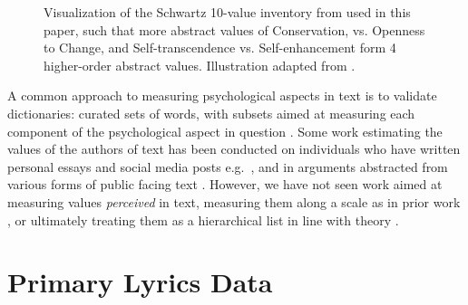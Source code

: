 \documentclass{article}
\begin{document}
\begin{figure}
 \centerline{}
 \caption{Visualization of the Schwartz 10-value inventory from \cite{schwartz1992universals} used in this paper, such that more abstract values of Conservation, vs. Openness to Change, and Self-transcendence vs. Self-enhancement form 4 higher-order abstract values. Illustration adapted from \cite{maio2010mental}. }
 \label{fig:circle}
\end{figure}

A common approach to measuring psychological aspects in text is to validate dictionaries: curated sets of words, with subsets aimed at measuring each component of the psychological aspect in question \cite{pennebaker2015development, graham2009liberals, holtrop2022exploring, ponizovskiy2020development}. Some work estimating the values of the authors of text has been conducted on individuals who have written personal essays and social media posts e.g.\ \cite{maheshwari2017societal, ponizovskiy2020development}, and in arguments abstracted from various forms of public facing text \cite{kiesel2022identifying}. However, we have not seen work aimed at measuring values \textit{perceived} in text, measuring them along a scale as in prior work \cite{schwartz1992universals}, or ultimately treating them as a hierarchical list in line with theory \cite{rokeach1973nature}. 

\section{Primary Lyrics Data}
\end{document}
